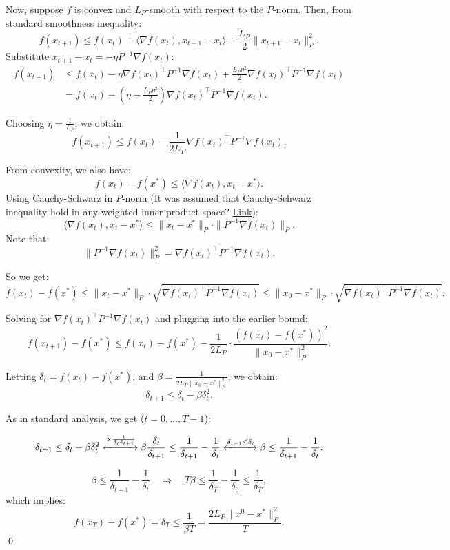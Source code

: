 \documentclass{article}
\begin{document}
Now, suppose \(f\) is convex and \(L_P\)-smooth with respect to the \(P\)-norm. Then, from standard smoothness inequality:
\[
f(x_{t+1}) \le f(x_t) + \langle \nabla f(x_t), x_{t+1} - x_t \rangle + \frac{L_P}{2} \|x_{t+1} - x_t\|_P^2. \tag{?}
\]
Substitute \(x_{t+1} - x_t = -\eta P^{-1} \nabla f(x_t)\):
\begin{align*}
f(x_{t+1}) 
&\le f(x_t) - \eta \nabla f(x_t)^\top P^{-1} \nabla f(x_t) + \frac{L_P \eta^2}{2} \nabla f(x_t)^\top P^{-1} \nabla f(x_t) \\
&= f(x_t) - \left( \eta - \frac{L_P \eta^2}{2} \right) \nabla f(x_t)^\top P^{-1} \nabla f(x_t).
\end{align*}

Choosing \( \eta = \frac{1}{L_P} \), we obtain:
\[
f(x_{t+1}) \le f(x_t) - \frac{1}{2 L_P} \nabla f(x_t)^\top P^{-1} \nabla f(x_t).
\]

From convexity, we also have:
\[
f(x_t) - f(x^*) \le \langle \nabla f(x_t), x_t - x^* \rangle.
\]
Using Cauchy-Schwarz in \(P\)-norm (It was assumed that Cauchy-Schwarz inequality hold in any weighted inner product space? \href{https://math.stackexchange.com/questions/463073/why-does-the-cauchy-schwarz-inequality-hold-in-any-inner-product-space}{Link}):
\[
\langle \nabla f(x_t), x_t - x^* \rangle \le \|x_t - x^*\|_P \cdot \|P^{-1} \nabla f(x_t)\|_P.
\]
Note that:
\[
\|P^{-1} \nabla f(x_t)\|_P^2 = \nabla f(x_t)^\top P^{-1} \nabla f(x_t).
\]

So we get:
\[
f(x_t) - f(x^*) \le \|x_t - x^*\|_P \cdot \sqrt{\nabla f(x_t)^\top P^{-1} \nabla f(x_t)} \le \|x_0 - x^*\|_P \cdot \sqrt{\nabla f(x_t)^\top P^{-1} \nabla f(x_t)}.
\]

Solving for \( \nabla f(x_t)^\top P^{-1} \nabla f(x_t) \) and plugging into the earlier bound:
\[
f(x_{t+1}) - f(x^*) \le f(x_t) - f(x^*) - \frac{1}{2 L_P} \cdot \frac{(f(x_t) - f(x^*))^2}{\|x_0 - x^*\|_P^2}.
\]

Letting \( \delta_t = f(x_t) - f(x^*) \), and \( \beta = \frac{1}{2 L_P \|x_0 - x^*\|_P^2} \), we obtain:
\[
\delta_{t+1} \le \delta_t - \beta \delta_t^2.
\]

As in standard analysis, we get ($t = 0, \dots, T - 1$):

\[
\delta_{t+1} \leq \delta_t - \beta \delta_t^2 \xleftrightarrow{\times \frac{1}{\delta_t \delta_{t+1}}}
\beta \frac{\delta_t}{\delta_{t+1}} \leq \frac{1}{\delta_{t+1}} - \frac{1}{\delta_t}
\xleftrightarrow{\delta_{t+1} \leq \delta_t}
\beta \leq \frac{1}{\delta_{t+1}} - \frac{1}{\delta_t}.
\]

\[
\beta \le \frac{1}{\delta_{t+1}} - \frac{1}{\delta_t} \quad \Rightarrow \quad T \beta \le \frac{1}{\delta_T} - \frac{1}{\delta_0} \le \frac{1}{\delta_T},
\]
which implies:
\[
f(x_T) - f(x^*) = \delta_T \le \frac{1}{\beta T} = \frac{2 L_P \|x^0 - x^*\|_P^2}{T}.
\]
\qed
\end{document}
